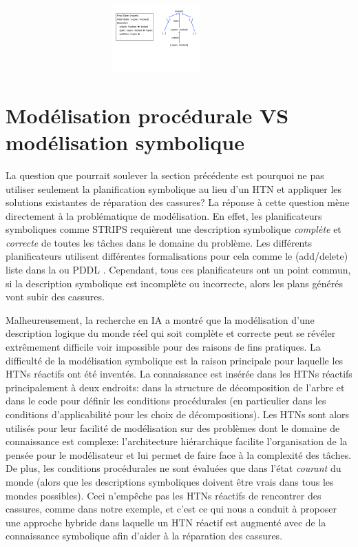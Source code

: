 \documentclass[a4paper,twoside,french]{article}
\begin{document}
		\begin{figure}[]
			\centerline{\includegraphics[width=3.7in, height=1in]{figs/planning}}
			\vskip 8pt
		\end{figure}
		 
		
		\section {Modélisation procédurale VS modélisation symbolique}
		La question que pourrait soulever la section précédente est pourquoi ne pas utiliser seulement la planification symbolique au lieu d'un HTN et appliquer les solutions existantes de réparation des cassures? La réponse à cette question mène directement à la problématique de modélisation. En effet, les planificateurs symboliques comme STRIPS requièrent une description symbolique {\em complète} et {\em correcte} de toutes les tâches  dans le domaine du problème. Les différents planificateurs utilisent différentes formalisations pour cela comme le (add/delete) liste dans la  ou PDDL \cite{ghallab1998pddl}. Cependant, tous ces planificateurs ont un point  commun, si la description symbolique est incomplète ou incorrecte, alors les plans générés vont subir des cassures. 
		\par Malheureusement, la recherche en IA \cite{gil1992acquiring} a montré que la modélisation d'une description logique du monde réel qui soit complète et correcte  peut se révéler extrêmement difficile voir impossible  pour des raisons de fins pratiques.  La difficulté de la modélisation symbolique est la raison principale pour laquelle les HTNs réactifs ont été inventés. La connaissance est insérée dans les HTNs réactifs principalement à deux endroits: dans la structure de décomposition de l'arbre et dans le code pour définir les conditions procédurales (en particulier dans les conditions d'applicabilité pour les choix de décompositions). Les HTNs sont alors utilisés pour leur facilité de modélisation sur des problèmes dont le domaine de connaissance est complexe: l'architecture hiérarchique facilite l'organisation de la pensée pour le modélisateur et lui permet de faire face à la complexité des tâches. De plus, les conditions procédurales ne sont évaluées que dans l'état {\em courant} du monde (alors que les descriptions symboliques doivent être vrais dans tous les mondes possibles). Ceci n'empêche pas les HTNs réactifs de rencontrer des cassures, comme dans notre exemple, et c'est ce qui nous a conduit à proposer une approche hybride dans laquelle un HTN réactif est augmenté avec de la connaissance symbolique afin d'aider à la réparation des cassures.
		
\end{document}
